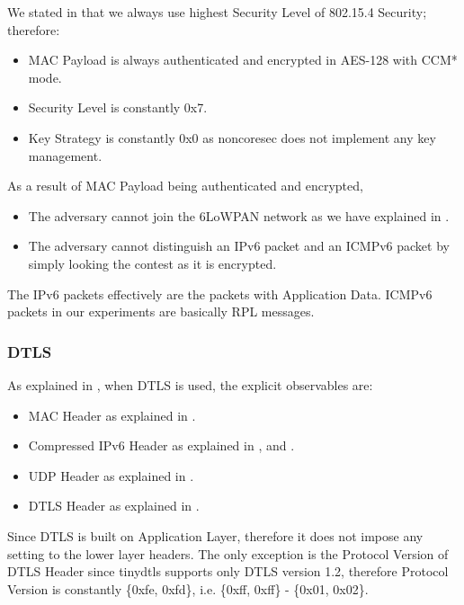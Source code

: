 We stated in  that we always use highest Security Level of 802.15.4 Security; therefore:
\begin{itemize}
	\item MAC Payload is always authenticated and encrypted in AES-128 with CCM* mode.
	\item Security Level is constantly 0x7.
	\item Key Strategy is constantly 0x0 as noncoresec does not implement any key management.
\end{itemize}

As a result of MAC Payload being authenticated and encrypted, 
\begin{itemize}
	\item The adversary cannot join the 6LoWPAN network as we have explained in .
	\item The adversary cannot distinguish an IPv6 packet and an ICMPv6 packet by simply looking the contest as it is encrypted. 
\end{itemize}

The IPv6 packets effectively are the packets with Application Data. ICMPv6 packets in our experiments are basically RPL messages.

\subsubsection{DTLS} \label{Subsubsec: Explicit DTLS}

As explained in , when DTLS is used, the explicit observables are: 

\begin{itemize}
	\item MAC Header as explained in .
	
	\item Compressed IPv6 Header as explained in ,  and .
	
	\item UDP Header as explained in .
	
	\item DTLS Header as explained in .
\end{itemize}

Since DTLS is built on Application Layer, therefore it does not impose any setting to the lower layer headers. The only exception is the Protocol Version of DTLS Header since tinydtls supports only DTLS version 1.2, therefore Protocol Version is constantly \{0xfe, 0xfd\}, i.e. \{0xff, 0xff\} - \{0x01, 0x02\}.

